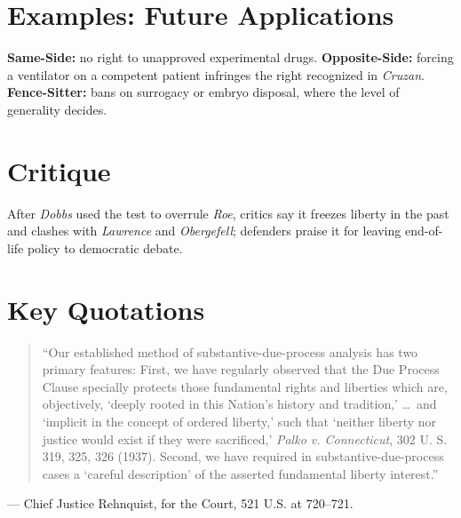 \documentclass[12pt]{article}
\begin{document}
\section{Examples: Future Applications}
\textbf{Same-Side:} no right to unapproved experimental drugs. \textbf{Opposite-Side:} forcing a ventilator on a competent patient infringes the right recognized in \textit{Cruzan}. \textbf{Fence-Sitter:} bans on surrogacy or embryo disposal, where the level of generality decides.

\section{Critique}
After \textit{Dobbs} used the test to overrule \textit{Roe}, critics say it freezes liberty in the past and clashes with \textit{Lawrence} and \textit{Obergefell}; defenders praise it for leaving end-of-life policy to democratic debate.

\section{Key Quotations}
\begin{quote}
``Our established method of substantive-due-process analysis has two primary features: First, we have regularly observed that the Due Process Clause specially protects those fundamental rights and liberties which are, objectively, `deeply rooted in this Nation's history and tradition,' \ldots\ and `implicit in the concept of ordered liberty,' such that `neither liberty nor justice would exist if they were sacrificed,' \textit{Palko v. Connecticut}, 302 U. S. 319, 325, 326 (1937). Second, we have required in substantive-due-process cases a `careful description' of the asserted fundamental liberty interest.''
\end{quote}
\noindent --- Chief Justice Rehnquist, for the Court, 521 U.S. at 720--721.
\end{document}

